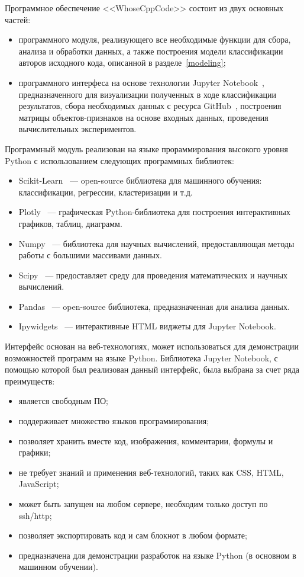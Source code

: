 Программное обеспечение <<WhoseCppCode>> состоит из двух основных частей:
\begin{itemize}
 \item программного модуля, реализующего все необходимые функции для сбора, анализа и обработки данных, 
а также построения модели классификации авторов исходного кода, описанной в разделе~\ref{modeling};
 \item программного интерфеса на основе технологии Jupyter Notebook~\cite{jupyter}, предназначенного 
 для визуализации полученных в ходе классификации результатов, сбора необходимых данных с ресурса GitHub~\cite{GitHub},
 построения матрицы объектов-признаков на основе входных данных, проведения вычислительных экспериментов.
\end{itemize}

Программный модуль реализован на языке прораммирования высокого уровня Python с использованием следующих 
программных библиотек:
\begin{itemize}
 \item Scikit-Learn~\cite{scikit} --- open-source библиотека для машинного обучения: классификации, регрессии, кластеризации и т.д.
 \item Plotly~\cite{plotly} --- графическая Python-библиотека для построения интерактивных графиков, таблиц, диаграмм.
 \item Numpy~\cite{numpy} --- библиотека для научных вычислений, предоставляющая методы работы с большими массивами данных.
 \item Scipy~\cite{scipy} --- предоставляет среду для проведения математических и научных вычислений.
 \item Pandas~\cite{pandas} --- open-source библиотека, предназначенная для анализа данных.
 \item Ipywidgets~\cite{widgets} --- интерактивные HTML виджеты для Jupyter Notebook.
\end{itemize}

Интерфейс основан на веб-технологиях, может использоваться для демонстрации возможностей
программ на языке Python. Библиотека Jupyter Notebook, с помощью которой был реализован
данный интерфейс, была выбрана за счет ряда преимуществ:
\begin{itemize}
 \item является свободным ПО;
 \item поддерживает множество языков программирования;
 \item позволяет хранить вместе код, изображения, комментарии, формулы и графики;
 \item не требует знаний и применения веб-технологий, таких как CSS, HTML, JavaScript;
 \item может быть запущен на любом сервере, необходим только доступ по ssh/http;
 \item позволяет экспортировать код и сам блокнот в любом формате;
 \item предназначена для демонстрации разработок на языке Python (в основном в машинном обучении).
\end{itemize}

